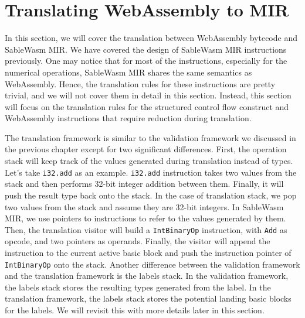 \section{Translating WebAssembly to MIR}

In this section, we will cover the translation between WebAssembly bytecode and SableWasm MIR. We have covered the design of SableWasm MIR instructions previously. One may notice that for most of the instructions, especially for the numerical operations, SableWasm MIR shares the same semantics as WebAssembly. Hence, the translation rules for these instructions are pretty trivial, and we will not cover them in detail in this section. Instead, this section will focus on the translation rules for the structured control flow construct and WebAssembly instructions that require reduction during translation.

The translation framework is similar to the validation framework we discussed in the previous chapter except for two significant differences. First, the operation stack will keep track of the values generated during translation instead of types. Let's take \texttt{i32.add} as an example. \texttt{i32.add} instruction takes two values from the stack and then performs 32-bit integer addition between them. Finally, it will push the result type back onto the stack. In the case of translation stack, we pop two values from the stack and assume they are 32-bit integers. In SableWasm MIR, we use pointers to instructions to refer to the values generated by them. Then, the translation visitor will build a \texttt{IntBinaryOp} instruction, with \texttt{Add} as opcode, and two pointers as operands. Finally, the visitor will append the instruction to the current active basic block and push the instruction pointer of \texttt{IntBinaryOp} onto the stack. Another difference between the validation framework and the translation framework is the labels stack. In the validation framework, the labels stack stores the resulting types generated from the label. In the translation framework, the labels stack stores the potential landing basic blocks for the labels. We will revisit this with more details later in this section.




